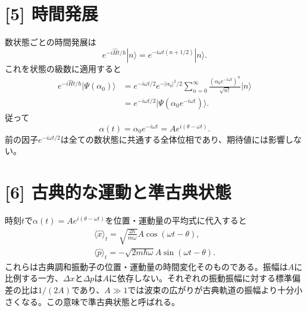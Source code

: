 \documentclass[11pt,a4paper]{article}
\begin{document}
\section*{[5] 時間発展}
数状態ごとの時間発展は
\begin{equation}
  e^{-i\hat Ht/\hbar}|n\rangle
  =e^{-i\omega t(n+1/2)}|n\rangle.
\end{equation}
これを状態の級数に適用すると
\begin{align}
  e^{-i\hat Ht/\hbar}|\Psi(\alpha_0)\rangle
  &=e^{-i\omega t/2}e^{-|\alpha_0|^2/2}
    \sum_{n=0}^{\infty}\frac{(\alpha_0e^{-i\omega t})^n}{\sqrt{n!}}|n\rangle\\
  &=e^{-i\omega t/2}|\Psi(\alpha_0e^{-i\omega t})\rangle.
\end{align}
従って
\begin{equation}
  \boxed{\alpha(t)=\alpha_0e^{-i\omega t}
  =Ae^{i(\theta-\omega t)}}.
\end{equation}
前の因子$e^{-i\omega t/2}$は全ての数状態に共通する全体位相であり、期待値には影響しない。

\section*{[6] 古典的な運動と準古典状態}
時刻$t$で$\alpha(t)=Ae^{i(\theta-\omega t)}$を位置・運動量の平均式に代入すると
\begin{align}
  \boxed{\langle\hat x\rangle_t
  =\sqrt{\frac{2\hbar}{m\omega}}A\cos(\omega t-\theta)},\\
  \boxed{\langle\hat p\rangle_t
  =-\sqrt{2m\hbar\omega}A\sin(\omega t-\theta)}.
\end{align}
これらは古典調和振動子の位置・運動量の時間変化そのものである。振幅は$A$に比例する一方、$\Delta x$と$\Delta p$は$A$に依存しない。それぞれの振動振幅に対する標準偏差の比は$1/(2A)$であり、$A\gg1$では波束の広がりが古典軌道の振幅より十分小さくなる。この意味で準古典状態と呼ばれる。
\end{document}
